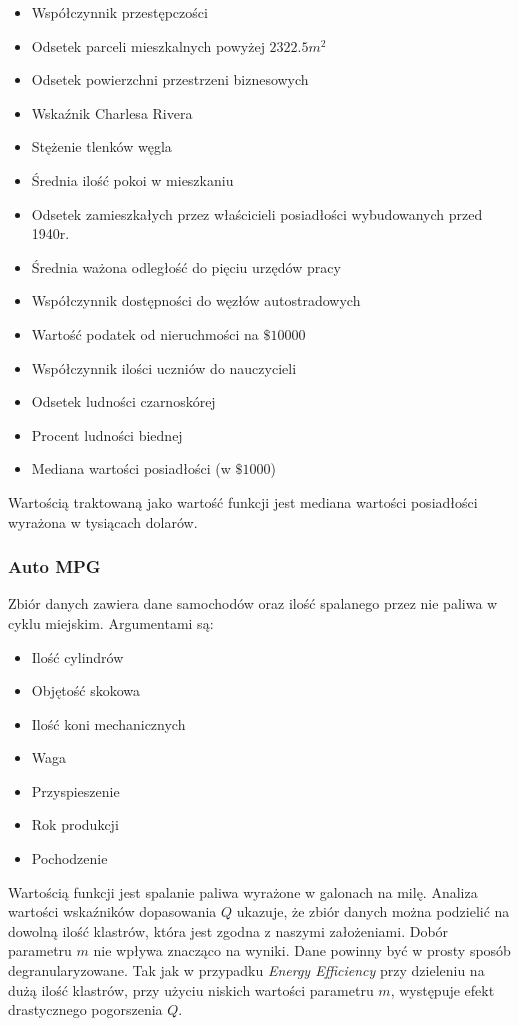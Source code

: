 \documentclass[a4paper; 11pt]{article}
\begin{document}
\begin{itemize}
\item Współczynnik przestępczości
\item Odsetek parceli mieszkalnych powyżej $2322.5m^2$
\item Odsetek powierzchni przestrzeni biznesowych
\item Wskaźnik Charlesa Rivera
\item Stężenie tlenków węgla
\item Średnia ilość pokoi w mieszkaniu
\item Odsetek zamieszkałych przez właścicieli posiadłości wybudowanych przed 1940r.
\item Średnia ważona odległość do pięciu urzędów pracy
\item Współczynnik dostępności do węzłów autostradowych
\item Wartość podatek od nieruchmości na $\$10000$
\item Współczynnik ilości uczniów do nauczycieli
\item Odsetek ludności czarnoskórej
\item Procent ludności biednej
\item Mediana wartości posiadłości (w $\$1000$)
\end{itemize}

Wartością traktowaną jako wartość funkcji jest mediana wartości posiadłości wyrażona w tysiącach dolarów.

\subsubsection{Auto MPG}
Zbiór danych zawiera dane samochodów oraz ilość spalanego przez nie paliwa w cyklu miejskim. Argumentami są:

\begin{itemize}
\item Ilość cylindrów
\item Objętość skokowa
\item Ilość koni mechanicznych
\item Waga
\item Przyspieszenie
\item Rok produkcji
\item Pochodzenie
\end{itemize}

Wartością funkcji jest spalanie paliwa wyrażone w galonach na milę. Analiza wartości wskaźników dopasowania
$Q$ ukazuje, że zbiór danych można podzielić na dowolną ilość klastrów, która jest zgodna z naszymi
założeniami. Dobór parametru $m$ nie wpływa znacząco na wyniki. Dane powinny być w prosty sposób
degranularyzowane. Tak jak w przypadku \emph{Energy Efficiency} przy dzieleniu na dużą ilość klastrów,
przy użyciu niskich wartości parametru $m$, występuje efekt drastycznego pogorszenia $Q$.
\end{document}
